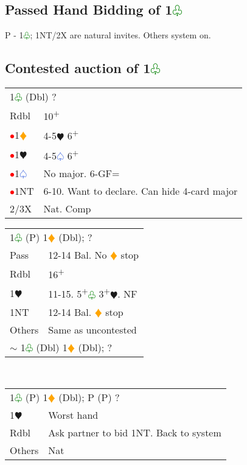 \documentclass{article}
\renewcommand{\sp}{\textcolor{RoyalBlue}{$\varspade$}}
\newcommand{\he}{\textcolor{RubineRed}{$\varheart$}}
\newcommand{\di}{\textcolor{Orange}{$\vardiamond$}}
\newcommand{\cl}{\textcolor{Green}{$\varclub$}}
\newcommand{\nt}{\relsize{-1}NT\relsize{1}}
\newcommand{\up}{\textsuperscript{+}}
\newcommand{\al}{\textcolor{red}{$\bullet$}}
\begin{document}
\subsection{Passed Hand Bidding of 1\cl{}}

P - 1\cl{}; 1\nt{}/2X are natural invites. Others system on.

\subsection{Contested auction of 1\cl{}}

\begin{tabular}{|l|p{6.5cm}}
	\multicolumn{2}{l}{1\cl{} (Dbl) ?}\\
	Rdbl & 10\up \\
	\al{}1\di{} & 4-5\he{} 6\up \\
	\al{}1\he{} & 4-5\sp{} 6\up \\
	\al{}1\sp{} & No major. 6-GF= \\
	\al{}1\nt{} & 6-10. Want to declare. Can hide 4-card major \\
	2/3X & Nat. Comp \\
\end{tabular}

\medskip

\begin{tabular}{|l|p{6.5cm}}
	\multicolumn{2}{l}{1\cl{} (P) 1\di{} (Dbl); ?}\\
	Pass & 12-14 Bal. No \di{} stop \\
	Rdbl & 16\up{} \\
	1\he{} & 11-15. 5\up{}\cl{} 3\up{}\he{}. NF \\
	1\nt{} & 12-14 Bal. \di{} stop \\
	Others & Same as uncontested \\
	\multicolumn{2}{l}{$\sim$ 1\cl{} (Dbl) 1\di{} (Dbl); ?} \\
\end{tabular}\\

\medskip

\begin{tabular}{|l|p{6.5cm}}
	\multicolumn{2}{l}{1\cl{} (P) 1\di{} (Dbl); P (P) ?}\\
	1\he{}& Worst hand \\
	Rdbl & Ask partner to bid 1\nt{}. Back to system \\
	Others & Nat
\end{tabular}

\medskip
\end{document}
